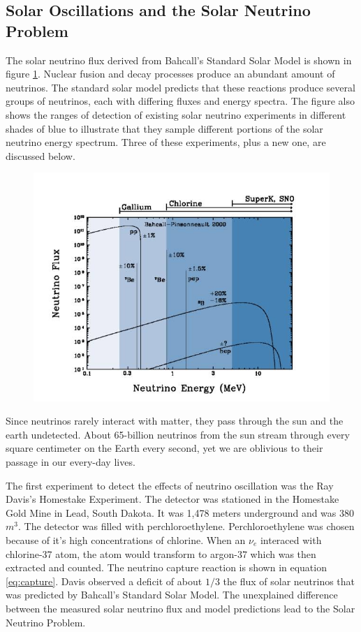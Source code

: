\subsection{Solar Oscillations and the Solar Neutrino Problem}

The solar neutrino flux derived from Bahcall's Standard Solar Model is shown in figure \ref{fig:solarmodel}. Nuclear fusion and decay processes produce an abundant amount of neutrinos. The standard solar model predicts that these reactions produce several groups of neutrinos, each with differing fluxes and energy spectra. The figure also shows the ranges of detection of existing solar neutrino experiments in different shades of blue to illustrate that they sample different portions of the solar neutrino energy spectrum. Three of these experiments, plus a new one, are discussed below.

\begin{figure}[htp]
\centering
\includegraphics[scale=.55]{figs/solarmodel.jpg}
\label{fig:solarmodel}
\end{figure}

Since neutrinos rarely interact with matter, they pass through the sun and the earth undetected. About 65-billion neutrinos from the sun stream through every square centimeter on the Earth every second, yet we are oblivious to their passage in our every-day lives. \cite{bnl}

The first experiment to detect the effects of neutrino oscillation was the Ray Davis's Homestake Experiment. The detector was stationed in the Homestake Gold Mine in Lead, South Dakota. It was 1,478 meters underground and was 380 $m^{3}$. The detector was filled with perchloroethylene. Perchloroethylene was chosen because of it's high concentrations of chlorine. When an $\nu_{e}$ interaced with chlorine-37 atom, the atom would transform to argon-37 which was then extracted and counted. The neutrino capture reaction is shown in equation \ref{eq:capture}. Davis observed a deficit of about $1/3$ the flux of solar neutrinos that was predicted by Bahcall's Standard Solar Model. The unexplained difference between the measured solar neutrino flux and model predictions lead to the Solar Neutrino Problem.\cite{fnal}


